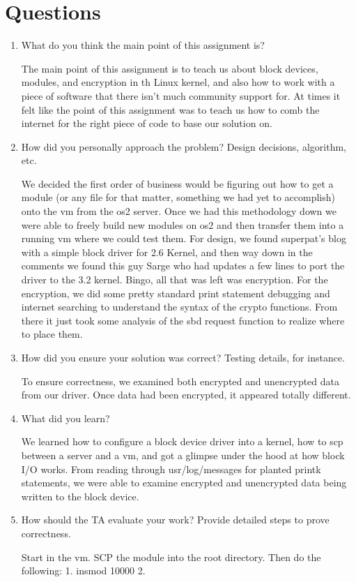 \documentclass[letterpaper,10pt,fleqn]{article}
\begin{document}
\section*{Questions}
\begin{enumerate}
\item What do you think the main point of this assignment is?

The main point of this assignment is to teach us about block devices, modules, and encryption in th Linux kernel, and also how to work with a piece of software that there isn't much community support for. At times it felt like the point of this assignment was to teach us how to comb the internet for the right piece of code to base our solution on. 

\item How did you personally approach the problem? Design decisions, algorithm, etc. 

We decided the first order of business would be figuring out how to get a module (or any file for that matter, something we had yet to accomplish) onto the vm from the os2 server. Once we had this methodology down we were able to freely build new modules on os2 and then transfer them into a running vm where we could test them. For design, we found superpat's blog with a simple block driver for 2.6 Kernel, and then way down in the comments we found this guy Sarge who had updates a few lines to port the driver to the 3.2 kernel. Bingo, all that was left was encryption. For the encryption, we did some pretty standard print statement debugging and internet searching to understand the syntax of the crypto functions. From there it just took some analysis of the sbd request function to realize where to place them.


\item How did you ensure your solution was correct? Testing details, for instance. 

To ensure correctness, we examined both encrypted and unencrypted data from our driver. Once data had been encrypted, it appeared totally different.


\item What did you learn? 

We learned how to configure a block device driver into a kernel, how to scp between a server and a vm, and got a glimpse under the hood at how block I/O works. From reading through usr/log/messages for planted printk statements, we were able to examine encrypted and unencrypted data being written to the block device. 

\item How should the TA evaluate your work? Provide detailed steps to prove correctness.

Start in the vm. SCP the module into the root directory. Then do the following:
1. insmod 10000
2. 

\end{enumerate}
\end{document}
